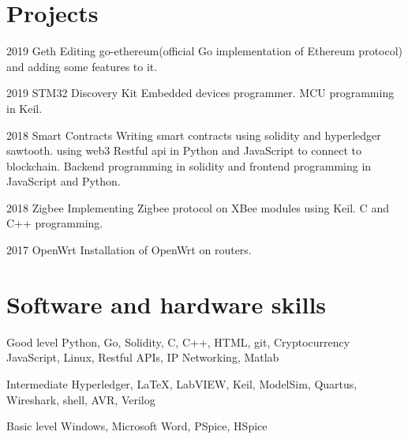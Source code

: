 \documentclass{tccv}
\begin{document}
\section{Projects}

\begin{yearlist}

\item{2019}
     {Geth}
     {Editing go-ethereum(official Go implementation of Ethereum protocol) and adding some features to it.}

\item{2019}
     {STM32 Discovery Kit}
     {Embedded devices programmer. MCU programming in Keil.}

\item{2018}
     {Smart Contracts}
     {Writing smart contracts using solidity and hyperledger sawtooth. using web3 Restful api in
     Python and JavaScript to connect to blockchain. Backend programming in solidity and frontend programming
     in JavaScript and Python.}

\item{2018}
     {Zigbee}
     {Implementing Zigbee protocol on XBee modules using Keil. C and C++ programming.}

\item{2017}
     {OpenWrt}
     {Installation of OpenWrt on routers.}

\end{yearlist}

%

\section{Software and hardware skills}

\begin{factlist}

\item{Good level}
     {Python, Go, Solidity, C, C++, HTML, git, Cryptocurrency
      JavaScript, Linux, Restful APIs, IP Networking, Matlab}

\item{Intermediate}
     {Hyperledger, \LaTeX, LabVIEW, Keil, ModelSim, Quartus,
     Wireshark, shell, AVR, Verilog}

\item{Basic level}
     {Windows, Microsoft Word, PSpice, HSpice}

\end{factlist}
\end{document}
